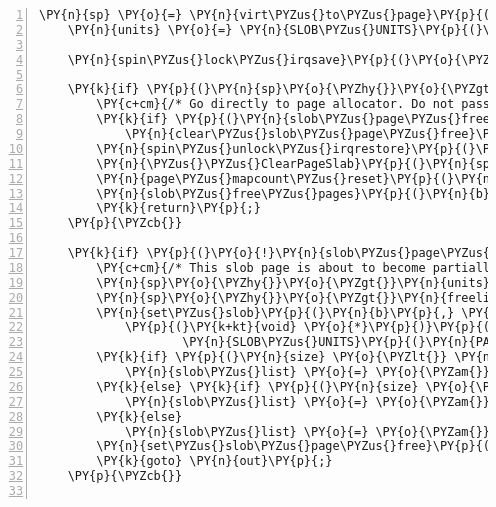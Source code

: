 \begin{Verbatim}[commandchars=\\\{\},numbers=left,firstnumber=1,stepnumber=1]
	\PY{n}{sp} \PY{o}{=} \PY{n}{virt\PYZus{}to\PYZus{}page}\PY{p}{(}\PY{n}{block}\PY{p}{)}\PY{p}{;}
	\PY{n}{units} \PY{o}{=} \PY{n}{SLOB\PYZus{}UNITS}\PY{p}{(}\PY{n}{size}\PY{p}{)}\PY{p}{;}

	\PY{n}{spin\PYZus{}lock\PYZus{}irqsave}\PY{p}{(}\PY{o}{\PYZam{}}\PY{n}{slob\PYZus{}lock}\PY{p}{,} \PY{n}{flags}\PY{p}{)}\PY{p}{;}

	\PY{k}{if} \PY{p}{(}\PY{n}{sp}\PY{o}{\PYZhy{}}\PY{o}{\PYZgt{}}\PY{n}{units} \PY{o}{+} \PY{n}{units} \PY{o}{=}\PY{o}{=} \PY{n}{SLOB\PYZus{}UNITS}\PY{p}{(}\PY{n}{PAGE\PYZus{}SIZE}\PY{p}{)}\PY{p}{)} \PY{p}{\PYZob{}}
		\PY{c+cm}{/* Go directly to page allocator. Do not pass slob allocator */}
		\PY{k}{if} \PY{p}{(}\PY{n}{slob\PYZus{}page\PYZus{}free}\PY{p}{(}\PY{n}{sp}\PY{p}{)}\PY{p}{)}
			\PY{n}{clear\PYZus{}slob\PYZus{}page\PYZus{}free}\PY{p}{(}\PY{n}{sp}\PY{p}{)}\PY{p}{;}
		\PY{n}{spin\PYZus{}unlock\PYZus{}irqrestore}\PY{p}{(}\PY{o}{\PYZam{}}\PY{n}{slob\PYZus{}lock}\PY{p}{,} \PY{n}{flags}\PY{p}{)}\PY{p}{;}
		\PY{n}{\PYZus{}\PYZus{}ClearPageSlab}\PY{p}{(}\PY{n}{sp}\PY{p}{)}\PY{p}{;}
		\PY{n}{page\PYZus{}mapcount\PYZus{}reset}\PY{p}{(}\PY{n}{sp}\PY{p}{)}\PY{p}{;}
		\PY{n}{slob\PYZus{}free\PYZus{}pages}\PY{p}{(}\PY{n}{b}\PY{p}{,} \PY{l+m+mi}{0}\PY{p}{)}\PY{p}{;}
		\PY{k}{return}\PY{p}{;}
	\PY{p}{\PYZcb{}}

	\PY{k}{if} \PY{p}{(}\PY{o}{!}\PY{n}{slob\PYZus{}page\PYZus{}free}\PY{p}{(}\PY{n}{sp}\PY{p}{)}\PY{p}{)} \PY{p}{\PYZob{}}
		\PY{c+cm}{/* This slob page is about to become partially free. Easy! */}
		\PY{n}{sp}\PY{o}{\PYZhy{}}\PY{o}{\PYZgt{}}\PY{n}{units} \PY{o}{=} \PY{n}{units}\PY{p}{;}
		\PY{n}{sp}\PY{o}{\PYZhy{}}\PY{o}{\PYZgt{}}\PY{n}{freelist} \PY{o}{=} \PY{n}{b}\PY{p}{;}
		\PY{n}{set\PYZus{}slob}\PY{p}{(}\PY{n}{b}\PY{p}{,} \PY{n}{units}\PY{p}{,}
			\PY{p}{(}\PY{k+kt}{void} \PY{o}{*}\PY{p}{)}\PY{p}{(}\PY{p}{(}\PY{k+kt}{unsigned} \PY{k+kt}{long}\PY{p}{)}\PY{p}{(}\PY{n}{b} \PY{o}{+}
					\PY{n}{SLOB\PYZus{}UNITS}\PY{p}{(}\PY{n}{PAGE\PYZus{}SIZE}\PY{p}{)}\PY{p}{)} \PY{o}{\PYZam{}} \PY{n}{PAGE\PYZus{}MASK}\PY{p}{)}\PY{p}{)}\PY{p}{;}
		\PY{k}{if} \PY{p}{(}\PY{n}{size} \PY{o}{\PYZlt{}} \PY{n}{SLOB\PYZus{}BREAK1}\PY{p}{)}
			\PY{n}{slob\PYZus{}list} \PY{o}{=} \PY{o}{\PYZam{}}\PY{n}{free\PYZus{}slob\PYZus{}small}\PY{p}{;}
		\PY{k}{else} \PY{k}{if} \PY{p}{(}\PY{n}{size} \PY{o}{\PYZlt{}} \PY{n}{SLOB\PYZus{}BREAK2}\PY{p}{)}
			\PY{n}{slob\PYZus{}list} \PY{o}{=} \PY{o}{\PYZam{}}\PY{n}{free\PYZus{}slob\PYZus{}medium}\PY{p}{;}
		\PY{k}{else}
			\PY{n}{slob\PYZus{}list} \PY{o}{=} \PY{o}{\PYZam{}}\PY{n}{free\PYZus{}slob\PYZus{}large}\PY{p}{;}
		\PY{n}{set\PYZus{}slob\PYZus{}page\PYZus{}free}\PY{p}{(}\PY{n}{sp}\PY{p}{,} \PY{n}{slob\PYZus{}list}\PY{p}{)}\PY{p}{;}
		\PY{k}{goto} \PY{n}{out}\PY{p}{;}
	\PY{p}{\PYZcb{}}


\end{Verbatim}
